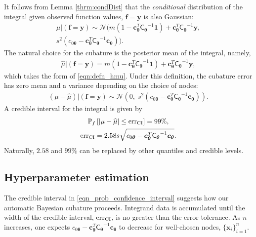 \documentclass[twocolumn]{svjour3}          %
\newcommand{\bm}[1]{\boldsymbol{#1}}
\newcommand{\vtheta}{{\bm{\theta}}}
\newcommand{\vc}{\bm{c}}
\newcommand{\vf}{\bm{f}}
\newcommand{\vx}{\bm{x}}
\newcommand{\vy}{\bm{y}}
\newcommand{\vone}{\bm{1}}
\newcommand{\mCtheta}{{\mathsf{C}_{\vtheta}}}
\newcommand{\calN}{\mathcal{N}}
\newcommand{\hmu}{\widehat{\mu}}
\newcommand{\err}{\textup{err}}
\begin{document}
It follows from Lemma \ref{thrm:condDist} that the \emph{conditional} distribution of the integral given observed function values, $\vf = \vy$ is also Gaussian:
\begin{multline} \label{eqn:condInteg}
\mu | (\vf = \vy) \sim \calN \bigl(m (1 - \vc_\vtheta^T \mCtheta^{-1} \vone)  + \vc_\vtheta^T \mCtheta^{-1} \vy, 
\\
s^2(c_{0\vtheta}  -\vc_\vtheta ^T \mCtheta^{-1} \vc_\vtheta) \bigr).
\end{multline}
The natural choice for  the cubature is the posterior mean of the integral, namely, 
\begin{align}
\label{eqn:BayesCub}
\widehat{\mu}  \vert ( \vf = \vy)
= m(1 - \vc_\vtheta^T  \mCtheta^{-1} \vone)
+ \vc_\vtheta^T \mCtheta^{-1} \vy,
\end{align}
which takes the form of \eqref{eqn:defn_hmu}.
Under this definition, the cubature error has zero mean and a variance depending on the choice of nodes:
\begin{align*}
(\mu-\hmu) | (\vf = \vy)
 \sim  \calN 
\left(
0, \;
s^2 (c_{0\vtheta} - \vc_\vtheta^T\mCtheta^{-1}\vc_\vtheta) 
\right).
\end{align*}
A credible interval for the integral is given by 
\begin{subequations} \label{eqn_prob_confidence_interval}
\begin{gather}
\mathbb{P}_f \left[
|\mu-\hmu| \leq \err_{\textup{CI}}
\right] = 99\%, \\
\err_{\textup{CI}} = 2.58 s \sqrt{c_{0\vtheta} - \vc_\vtheta^T\mCtheta^{-1}\vc_\vtheta}.
\end{gather}
\end{subequations}
Naturally, $2.58$ and $99\%$ can be replaced by other quantiles and credible levels.

\subsection{Hyperparameter estimation}
The credible interval in \eqref{eqn_prob_confidence_interval} suggests how our automatic Bayesian cubature proceeds.  Integrand data is accumulated until the width of the credible interval, $\err_{\textup{CI}}$, is no greater than the error tolerance.  As $n$ increases, one expects $c_{0\vtheta} - \vc_\vtheta^T\mCtheta^{-1}\vc_\vtheta$ to decrease for well-chosen nodes, $\{\vx_i\}_{i=1}^n$.
\end{document}
